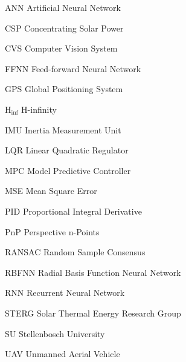 \begin{Nomencl}[2cm]
   \item[ANN]		Artificial Neural Network
   \item[CSP] 		Concentrating Solar Power
   \item[CVS] 		Computer Vision System
   \item[FFNN]		Feed-forward Neural Network
   \item[GPS] 		Global Positioning System	
   \item[H$_{\inf}$]	H-infinity 
   \item[IMU]		Inertia Measurement Unit
   \item[LQR]		Linear Quadratic Regulator
   \item[MPC]		Model Predictive Controller
   \item[MSE]		Mean Square Error
   \item[PID]		Proportional Integral Derivative
   \item[PnP]		Perspective n-Points
   \item[RANSAC]	Random Sample Consensus
   \item[RBFNN]		Radial Basis Function Neural Network
   \item[RNN]		Recurrent Neural Network
   \item[STERG]		Solar Thermal Energy Research Group
   \item[SU]		Stellenbosch University
   \item[UAV]		Unmanned Aerial Vehicle

\end{Nomencl}

\endinput
